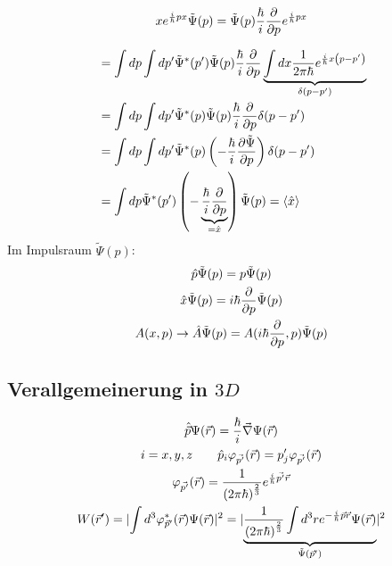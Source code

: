 \begin{einsn}
    \begin{equation*}
        x e^{\frac{i}{\hbar}px}\tilde{\Psi}(p) = \tilde{\Psi}(p)
        \frac{\hbar}{i}\frac{\partial}{\partial p}  e^{\frac{i}{\hbar}px}
    \end{equation*}
\end{einsn}
\begin{align*}
    &=
    \int dp \int dp' \tilde{\Psi}^*(p')\tilde{\Psi}(p) \frac{\hbar}{i}\frac{\partial}{\partial
    p} \underbrace{\int dx \frac{1}{2 \pi \hbar} e^{\frac{i}{\hbar}x \left( p-p' \right)
    }}_{\delta(p-p')}\\
    &=
    \int dp \int dp' \tilde{\Psi}^*(p)\tilde{\Psi}(p) \frac{\hbar}{i}
    \frac{\partial}{\partial p} \delta(p - p') \\
    &=
    \int dp \int dp' \tilde{\Psi}^*(p) \left( - \frac{\hbar}{i}
    \frac{\partial \tilde{\Psi}}{\partial p}\right) \delta(p -p') \\
    &=
    \int dp \tilde{\Psi}^*(p')\left( -  
    \underbrace{\frac{\hbar}{i}\frac{\partial}{\partial p}}_{= \hat{x}}\right) \tilde{\Psi}(p)
    =
    \left\langle \hat{x} \right\rangle 
\end{align*}
Im Impulsraum $\tilde{\Psi}(p)$:
\begin{gather*}
    \hat{p} \tilde{\Psi}(p) = p \tilde{\Psi}(p)\\
    \hat{x} \tilde{\Psi}(p) = i\hbar \frac{\partial}{\partial p} \tilde{\Psi}(p)\\
    A(x,p) \rightarrow \hat{A} \tilde{\Psi}(p) = A(i \hbar \frac{\partial}{\partial p},p)
    \tilde{\Psi}(p)
\end{gather*}
\subsection{Verallgemeinerung in $3D$} %
\label{sub:Verallgemeinerung_in_$3D$}
\begin{gather*}
    \hat{\vec{p}}\Psi(\vec{r}) = \frac{\hbar}{i} \vec{\nabla} \Psi(\vec{r})\\
    i = x,y,z \qquad \hat{p}_i \varphi_{\vec{p'}}(\vec{r}) = p'_j
    \varphi_{\vec{p'}}(\vec{r}) \\
    \varphi_{\vec{p'}}(\vec{r}) = 
    \frac{1}{\left( 2 \pi \hbar \right)^{\frac{2}{3}}} e^{\frac{i}{\hbar}\vec{p'}\vec{r}}\\
    W(\vec{r}')=
    \lvert \int d^3 \varphi_{\vec{p}'}^* (\vec{r}) \Psi(\vec{r}) \rvert^2
    =
    \lvert
    \underbrace{
    \frac{1}{\left( 2 \pi \hbar \right)^{\frac{2}{3}}} \int d^3 r e^{- \frac{i}{\hbar}\vec{p}\vec{r}}\Psi(\vec{r})
    }_{
    \tilde{\Psi}(\vec{p}')}
    \rvert^2
\end{gather*}
